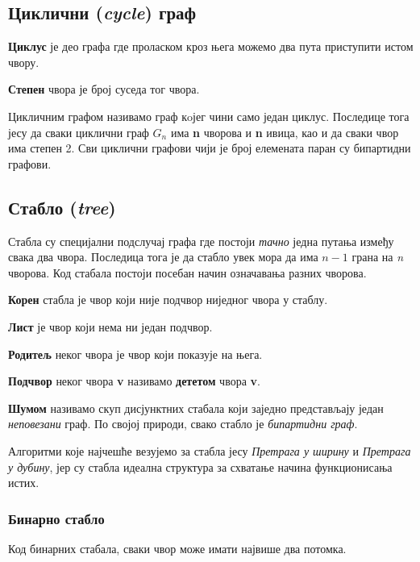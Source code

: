\documentclass[11pt, oneside, a4paper]{article}
\begin{document}
\subsection{Циклични (\textit{cycle}) граф}
\textbf{Циклус} је део графа где проласком кроз њега можемо два пута приступити истом чвору. \par
\textbf{Степен} чвора је број суседа тог чвора. \par
Цикличним графом називамо граф кoјег чини само један циклус. Последице тога јесу да сваки циклични граф \textit{$G_n$} има \textbf{n} чворова и \textbf{n} ивица, као и да сваки чвор има степен 2. Сви циклични графови чији је број елемената паран су бипартидни графови. 



\subsection{Стабло (\textit{tree})}
Стабла су специјални подслучај графа где постоји \emph{тачно} једна путања између свака два чвора. Последица тога је да стабло увек мора да има $n-1$ грана на \textit{n} чворова. Код стабала постоји посебан начин означавања разних чворова. \par 
\textbf{Корен} стабла је чвор који није подчвор ниједног чвора у стаблу. \par
\textbf{Лист} је чвор који нема ни један подчвор.\par
\textbf{Родитељ} неког чвора је чвор који показује на њега. \par
\textbf{Подчвор} неког чвора \textbf{v} називамо \textbf{дететом} чвора \textbf{v}. \par
\textbf{Шумом} називамо скуп дисјунктних стабала који заједно представљају један \textit{неповезани} граф. По својој природи, свако стабло је \textit{бипартидни граф}. \par
Алгоритми које најчешће везујемо за стабла јесу \textit{Претрага у ширину} и \textit{Претрага у дубину}, јер су стабла идеална структура за схватање начина функционисања истих. 
\subsubsection*{Бинарно стабло}
Код бинарних стабала, сваки чвор може имати највише два потомка.
\end{document}

